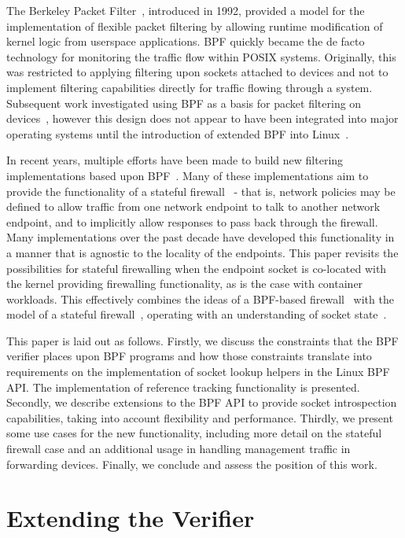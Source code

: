 \documentclass[10pt,sigconf,authorversion]{lpc}
\begin{document}
The Berkeley Packet Filter~\cite{cbpf}, introduced in 1992, provided a model
for the implementation of flexible packet filtering by allowing runtime
modification of kernel logic from userspace applications. BPF quickly became
the de facto technology for monitoring the traffic flow within POSIX systems.
Originally, this was restricted to applying filtering upon sockets attached to
devices and not to implement filtering capabilities directly for traffic
flowing through a system. Subsequent work investigated using BPF as a basis for
packet filtering on devices~\cite{ipfw}, however this design does not appear to
have been integrated into major operating systems until the introduction of
extended BPF into Linux~\cite{lwnebpf}.

In recent years, multiple efforts have been made to build new filtering
implementations based upon
BPF~\cite{cilium,ovs-ebpf,nsx-harmony,droplet,xdp-ddos,alfwrapper}. Many of
these implementations aim to provide the functionality of a stateful
firewall~\cite{stateful-fw} - that is, network policies may be defined to allow
traffic from one network endpoint to talk to another network endpoint, and to
implicitly allow responses to pass back through the firewall. Many
implementations over the past decade have developed this functionality in a
manner that is agnostic to the locality of the endpoints. This paper revisits
the possibilities for stateful firewalling when the endpoint socket is
co-located with the kernel providing firewalling functionality, as is the case
with container workloads. This effectively combines the ideas of a BPF-based
firewall~\cite{ipfw} with the model of a stateful firewall~\cite{stateful-fw},
operating with an understanding of socket state~\cite{dfw}.

This paper is laid out as follows. Firstly, we discuss the constraints that the
BPF verifier places upon BPF programs and how those constraints translate into
requirements on the implementation of socket lookup helpers in the Linux BPF
API. The implementation of reference tracking functionality is presented.
Secondly, we describe extensions to the BPF API to provide socket introspection
capabilities, taking into account flexibility and performance. Thirdly, we
present some use cases for the new functionality, including more detail on the
stateful firewall case and an additional usage in handling management traffic
in forwarding devices. Finally, we conclude and assess the position of this
work.

\section{Extending the Verifier}
\end{document}
